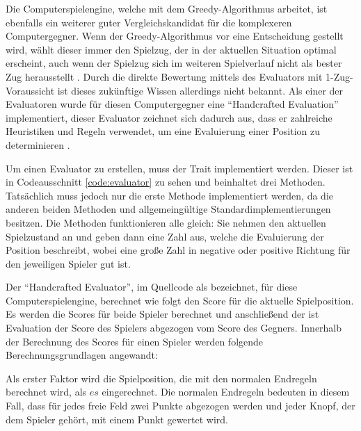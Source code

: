 Die Computerspielengine, welche mit dem Greedy-Algorithmus arbeitet, ist ebenfalls ein weiterer guter Vergleichskandidat für die komplexeren Computergegner. Wenn der Greedy-Algorithmus vor eine Entscheidung gestellt wird, wählt dieser immer den Spielzug, der in der aktuellen Situation optimal erscheint, auch wenn der Spielzug sich im weiteren Spielverlauf nicht als bester Zug herausstellt \cite[S. 234]{2023Greedy}. Durch die direkte Bewertung mittels des Evaluators mit 1-Zug-Voraussicht ist dieses zukünftige Wissen allerdings nicht bekannt. Als einer der Evaluatoren wurde für diesen Computergegner eine \enquote{Handcrafted Evaluation} implementiert, dieser Evaluator zeichnet sich dadurch aus, dass er zahlreiche Heuristiken und Regeln verwendet, um eine Evaluierung einer Position zu determinieren \cite{2023.StockfishTerminology}.



\pagebreak

Um einen Evaluator zu erstellen, muss der Trait  implementiert werden. Dieser ist in Codeausschnitt \ref{code:evaluator} zu sehen und beinhaltet drei Methoden. Tatsächlich muss jedoch nur die erste Methode  implementiert werden, da die anderen beiden Methoden  und  allgemeingültige Standardimplementierungen besitzen. Die Methoden funktionieren alle gleich: Sie nehmen den aktuellen Spielzustand an und geben dann eine Zahl aus, welche die Evaluierung der Position beschreibt, wobei eine große Zahl in negative oder positive Richtung für den jeweiligen Spieler gut ist.

Der \enquote{Handcrafted Evaluator}, im Quellcode als  bezeichnet, für diese Computerspielengine, berechnet wie folgt den Score für die aktuelle Spielposition. Es werden die Scores für beide Spieler berechnet und anschließend der ist Evaluation der Score des Spielers abgezogen vom Score des Gegners. Innerhalb der Berechnung des Scores für einen Spieler werden folgende Berechnungsgrundlagen angewandt:

Als erster Faktor wird die Spielposition, die mit den normalen Endregeln berechnet wird, als $es$ eingerechnet. Die normalen Endregeln bedeuten in diesem Fall, dass für jedes freie Feld zwei Punkte abgezogen werden und jeder Knopf, der dem Spieler gehört, mit einem Punkt gewertet wird.


